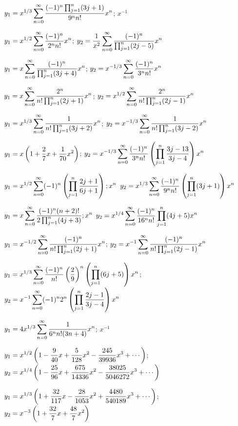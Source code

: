 $y_1=\displaystyle{x^{1/3}\sum_{n=0}^\infty\frac{(-1)^n\prod_{j=1}^n(3j+1)}{9^nn!}x^n}$;
$x^{-1}$

$y_1=\displaystyle{x^{1/2}\sum_{n=0}^\infty\frac{(-1)^n}{2^nn!}x^n}$;
$y_2=\displaystyle{\frac{1}{x^2}\sum_{n=0}^\infty\frac{(-1)^n}{\prod_{j=1}^n(2j-5)}
x^n}$

$y_1=\displaystyle{x\sum_{n=0}^\infty\frac{(-1)^n}{\prod_{j=1}^n(3j+4)}x^n}$;
  $y_2=\displaystyle{x^{-1/3}\sum_{n=0}^\infty\frac{(-1)^n}{3^nn!}x^n}$

$y_1=\displaystyle{x\sum_{n=0}^\infty\frac{2^n}{n!\prod_{j=1}^n(2j+1)}x^n}$;
$y_2=\displaystyle{x^{1/2}\sum_{n=0}^\infty\frac{2^n}{n!\prod_{j=1}^n(2j-1)}x^n}$

$y_1=\displaystyle{x^{1/3}\sum_{n=0}^\infty\frac{1}{n!\prod_{j=1}^n(3j+2)} x^n}$;
$y_2=\displaystyle{x^{-1/3}\sum_{n=0}^\infty\frac{1}{n!\prod_{j=1}^n(3j-2)}
x^n}$

$y_1=\displaystyle{x\left(1+\frac{2}{7}x+\frac{1}{70}x^2\right)}$;
$y_2=\displaystyle{x^{-1/3}\sum_{n=0}^\infty\frac{(-1)^n}{3^nn!}\left(\prod_{j=1}^n
\frac{3j-13}{3j-4}\right)
x^n}$

$y_1=\displaystyle{x^{1/2}\sum_{n=0}^\infty(-1)^n\left(\prod_{j=1}^n\frac{2j+1}{6j+1}\right);
x^n}$
$y_2=\displaystyle{x^{1/3}\sum_{n=0}^\infty\frac{(-1)^n}{9^nn!}
\left(\prod_{j=1}^n(3j+1)\right)x^n}$

$y_1=\displaystyle{x\sum_{n=0}^\infty\frac{(-1)^n(n+2)!}{2\prod_{j=1}^n(4j+3)};
x^n}$
$y_2=\displaystyle{x^{1/4}\sum_{n=0}^\infty\frac{(-1)^n}{16^nn!}\prod_{j=1}^n(4j+5)
x^n}$

$y_1=\displaystyle{x^{-1/2}\sum_{n=0}^\infty\frac{(-1)^n}{n!\prod_{j=1}^n(2j+1)}
x^n}$;    $y_2=\displaystyle{x^{-1}\sum_{n=0}^\infty\frac{(-1)^n}{n!\prod_{j=1}^n(2j-1)} x^n}$

$y_1=\displaystyle{x^{1/3}\sum_{n=0}^\infty\frac{(-1)^n}{n!}\left(\frac29\right)^n\left(\prod_{j=1}^n(6j+5)\right)
x^n}$;
$y_2=\displaystyle{x^{-1}\sum_{n=0}^\infty(-1)^n2^n\left(\prod_{j=1}^n
\frac{2j-1}{3j-4}\right) x^n}$

$y_1=4\displaystyle{x^{1/3}\sum_{n=0}^\infty\frac{1}{6^nn!(3n+4)}
x^n}$;
 $x^{-1}$

$y_1=\displaystyle{x^{1/2}\left(1-\frac{9}{40}x+\frac{5}{128}x^2-\frac{245}{39936}x^3
+\cdots\right)}$;    \,
$y_2=\displaystyle{x^{1/4}\left(1-\frac{25}{96}x+\frac{675}{14336}x^2-
\frac{38025}{5046272}x^3
+\cdots\right)}$

$y_1=\displaystyle{x^{1/3}\left(1+\frac{32}{117}x-\frac{28}{1053}x^2+
\frac{4480}{540189}x^3+\cdots\right)}$;    \,
$y_2=\displaystyle{x^{-3}\left(1+\frac{32}{7}x+\frac{48}{7}x^2\right)}$

